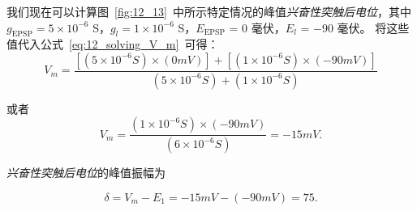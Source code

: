 我们现在可以计算图~\ref{fig:12_13}~中所示特定情况的峰值\textit{兴奋性突触后电位}，其中 $ g_{\text{EPSP}} = 5 \times 10^{−6}$ S，$ g_l = 1 \times 10^{−6}$ S，$E_{\text{EPSP}}$ = 0 毫伏，$ E_l $ = −90 毫伏。
将这些值代入公式~\ref{eq:12_solving_V_m}~可得：
\begin{equation}\label{eq:12_substituting_V_m_1}
	V_m = 
	\frac{
		[
		(5 \times 10^{-6} \textit{S}) \times (0 \textit{mV})
		] 
		+ 
		[
			(1 \times 10^{-6} \textit{S}) \times
			(-90 \textit{mV})
		]
	}{
		(5 \times 10^{-6} \textit{S})
		+ 
		(1 \times 10^{-6} S)
	}
\end{equation}

或者
\begin{equation}\label{eq:12_substituting_V_m_2}
	V_m = 
	\frac{
		(1 \times 10^{-6} \textit{S})
		\times
		(-90 \textit{mV})
	}{
		(6 \times 10^{-6} \textit{S})
	}
	= -15 \textit{mV}.
\end{equation}


\textit{兴奋性突触后电位}的峰值振幅为

\begin{equation}\label{peak_amplitude}
	\delta = V_m - E_1 = -15 \textit{mV} - (-90\textit{mV}) = 75.
\end{equation}


